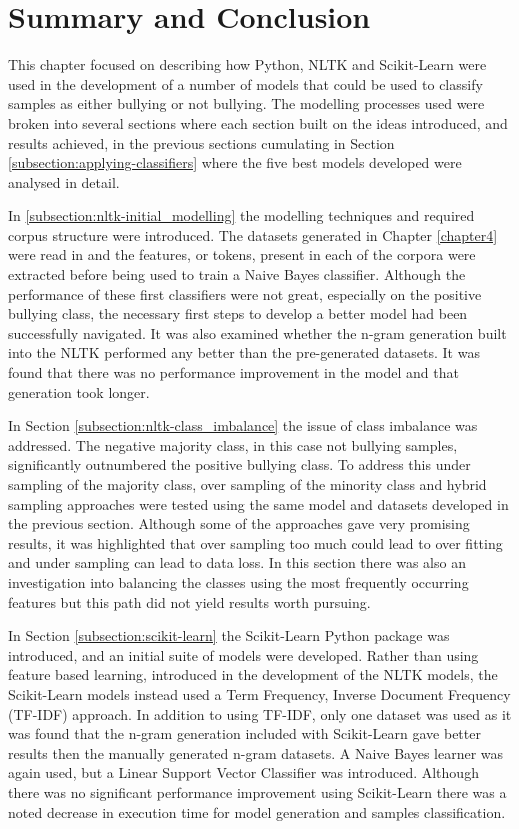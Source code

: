 \section{Summary and Conclusion}
\label{section:sec5:summary_conclusion}

This chapter focused on describing how Python, NLTK and Scikit-Learn were used in the development of a number of models that could be used to classify samples as either bullying or not bullying. The modelling processes used were broken into several sections where each section built on the ideas introduced, and results achieved, in the previous sections cumulating in Section \ref{subsection:applying-classifiers} where the five best models developed were analysed in detail.

In \ref{subsection:nltk-initial_modelling} the modelling techniques and required corpus structure were introduced. The datasets generated in Chapter \ref{chapter4} were read in and the features, or tokens, present in each of the corpora were extracted before being used to train a Naive Bayes classifier. Although the performance of these first classifiers were not great, especially on the positive bullying class, the necessary first steps to develop a better model had been successfully navigated. It was also examined whether the n-gram generation built into the NLTK performed any better than the pre-generated datasets. It was found that there was no performance improvement in the model and that generation took longer. 

In Section \ref{subsection:nltk-class_imbalance} the issue of class imbalance was addressed. The negative majority class, in this case not bullying samples, significantly outnumbered the positive bullying class. To address this under sampling of the majority class, over sampling of the minority class and hybrid sampling approaches were tested using the same model and datasets developed in the previous section. Although some of the approaches gave very promising results, it was highlighted that over sampling too much could lead to over fitting and under sampling can lead to data loss. In this section there was also an investigation into balancing the classes using the most frequently occurring features but this path did not yield results worth pursuing.

In Section \ref{subsection:scikit-learn} the Scikit-Learn Python package was introduced, and an initial suite of models were developed. Rather than using feature based learning, introduced in the development of the NLTK models, the Scikit-Learn models instead used a Term Frequency, Inverse Document Frequency  (TF-IDF) approach. In addition to using TF-IDF, only one dataset was used as it was found that the n-gram generation included with Scikit-Learn gave better results then the manually generated n-gram datasets. A Naive Bayes learner was again used, but a Linear Support Vector Classifier was introduced. Although there was no significant performance improvement using Scikit-Learn there was a noted decrease in execution time for model generation and samples classification.

